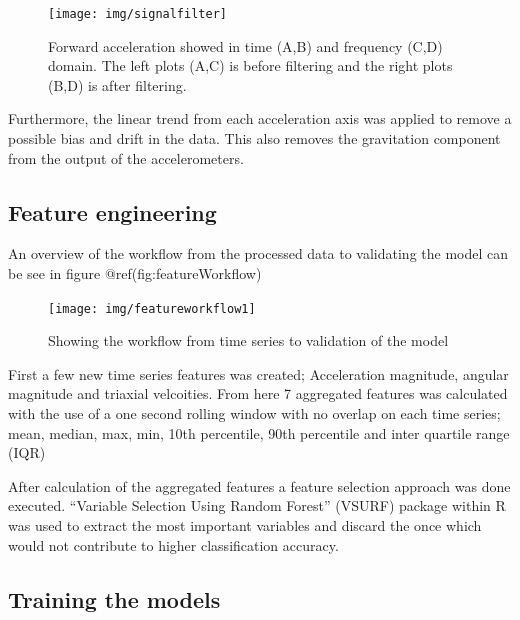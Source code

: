 \documentclass[
]{article}
\begin{document}
\begin{figure}
\texttt{[image: img/signalfilter]} \caption{Forward acceleration showed in time (A,B) and frequency (C,D) domain. The left plots (A,C) is before filtering and the right plots (B,D) is after filtering.}\label{fig:lowpassFilter}
\end{figure}

Furthermore, the linear trend from each acceleration axis was applied to
remove a possible bias and drift in the data. This also removes the
gravitation component from the output of the accelerometers.

\hypertarget{feature-engineering}{%
\subsection{Feature engineering}\label{feature-engineering}}

An overview of the workflow from the processed data to validating the
model can be see in figure @ref(fig:featureWorkflow)

\begin{figure}
\texttt{[image: img/featureworkflow1]} \caption{Showing the workflow from time series to validation of the model}\label{fig:featureWorkflow}
\end{figure}

First a few new time series features was created; Acceleration
magnitude, angular magnitude and triaxial velcoities. From here 7
aggregated features was calculated with the use of a one second rolling
window with no overlap on each time series; mean, median, max, min, 10th
percentile, 90th percentile and inter quartile range (IQR)

After calculation of the aggregated features a feature selection
approach was done executed. ``Variable Selection Using Random Forest''
(VSURF) \citep{Genuer2010, Genuer2015} package within R was used to
extract the most important variables and discard the once which would
not contribute to higher classification accuracy.

\hypertarget{training-the-models}{%
\subsection{Training the models}\label{training-the-models}}
\end{document}
